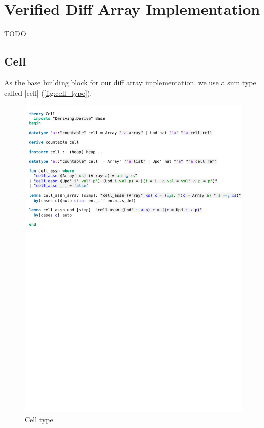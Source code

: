 \chapter{Verified Diff Array Implementation}\label{chapter:diff-array}
 
TODO 
 
\section{Cell}

As the base building block for our diff array implementation, we use a sum type called |cell| (\autoref{fig:cell_type}).

\begin{figure}[htpb]
    \includegraphics[trim={0 26,7cm 0 2,5cm}, clip, width=1.00\textwidth]{figures/Theory_Cell.pdf}
    \caption[Cell type]{Cell type}
    \label{fig:cell_type}
\end{figure}

